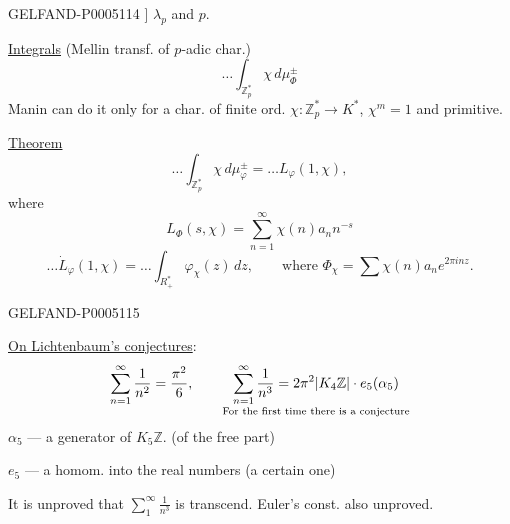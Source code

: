 \begin{GelfandAdjacentEvidence}{GELFAND-P000511}{4}
]
$\lambda_p$ and $p$.

\uline{Integrals} (Mellin transf. of $p$-adic char.)
\[
\ldots\int_{\mathbb Z_p^*}\chi\,d\mu_\Phi^\pm
\]
Manin can do it only for a char. of finite ord. $\chi:\mathbb Z_p^*\to K^*$,
$\chi^m=1$ and primitive.

\uline{Theorem}
\[
\ldots\int_{\mathbb Z_p^*}\chi\,d\mu_\varphi^\pm=\ldots L_\varphi(1,\chi),
\]
where
\[
L_\Phi(s,\chi)=\sum_{n=1}^\infty\chi(n)a_n n^{-s}
\]
\[
\ldots\dot L_\varphi(1,\chi)
=\ldots\int_{R_+^*}\varphi_\chi(z)\,dz,
\qquad\text{where }\Phi_\chi=\sum\chi(n)a_ne^{2\pi inz}.
\]
\end{GelfandAdjacentEvidence}
\begin{GelfandAdjacentEvidence}{GELFAND-P000511}{5}


\uline{On Lichtenbaum’s conjectures}: 
\[
\sum_{n=1}^\infty\frac{1}{n^2}=\frac{\pi^2}{6},\qquad
\underset{\text{For the first time there is a conjecture}}{%
\sum_{n=1}^\infty\frac{1}{n^3}=2\pi^2\lvert K_4\mathbb Z\rvert\cdot e_5(\alpha_5)}
\]
$\alpha_5$ — a generator of $K_5\mathbb Z$. (of the free part)

$e_5$ — a homom. into the real numbers (a certain one)

It is unproved that $\displaystyle\sum_1^\infty\frac{1}{n^3}$ is transcend.
Euler’s const. also unproved.

\end{GelfandAdjacentEvidence}



